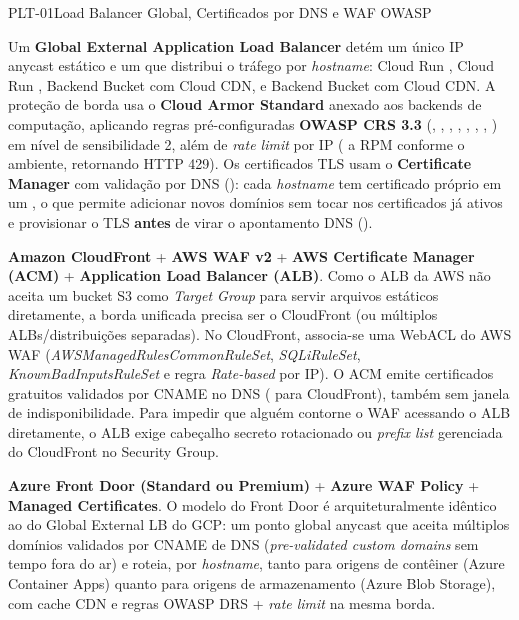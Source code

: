 \begin{pecaarq}{PLT-01}{Load Balancer Global, Certificados por DNS e WAF OWASP}{\sgcp~\nativo\enspace\saws~\equivalente\enspace\sazure~\nativo}
\begin{campos}
  \item[Como é hoje (GCP)] Um \textbf{Global External Application Load Balancer}
    detém um único IP anycast estático e um  que distribui o
    tráfego por \emph{hostname}:  \seta{} Cloud Run ,
     \seta{} Cloud Run ,  \seta{}
    Backend Bucket  com Cloud CDN, e  \seta{}
    Backend Bucket  com Cloud CDN. A proteção de borda usa o
    \textbf{Cloud Armor Standard} anexado aos backends de computação, aplicando
    regras pré-configuradas \textbf{OWASP CRS 3.3} (,
    , , ,
    , ,
    , ) em nível de
    sensibilidade 2, além de \emph{rate limit} por IP ( a  RPM
    conforme o ambiente, retornando HTTP 429). Os certificados TLS usam o
    \textbf{Certificate Manager} com validação por DNS ():
    cada \emph{hostname} tem certificado próprio em um , o
    que permite adicionar novos domínios sem tocar nos certificados já ativos e
    provisionar o TLS \textbf{antes} de virar o apontamento DNS ().
  \item[Equivalente AWS] \textbf{Amazon CloudFront} + \textbf{AWS WAF v2} +
    \textbf{AWS Certificate Manager (ACM)} + \textbf{Application Load Balancer
    (ALB)}. Como o ALB da AWS não aceita um bucket S3 como \emph{Target Group}
    para servir arquivos estáticos diretamente, a borda unificada precisa ser o
    CloudFront (ou múltiplos ALBs/distribuições separadas). No CloudFront,
    associa-se uma WebACL do AWS WAF (\emph{AWSManagedRulesCommonRuleSet},
    \emph{SQLiRuleSet}, \emph{KnownBadInputsRuleSet} e regra \emph{Rate-based}
    por IP). O ACM emite certificados gratuitos validados por CNAME no DNS
    ( para CloudFront), também sem janela de indisponibilidade.
    Para impedir que alguém contorne o WAF acessando o ALB diretamente, o ALB
    exige cabeçalho secreto rotacionado ou \emph{prefix list} gerenciada do
    CloudFront no Security Group.
  \item[Equivalente Azure] \textbf{Azure Front Door (Standard ou Premium)} +
    \textbf{Azure WAF Policy} + \textbf{Managed Certificates}. O modelo do Front
    Door é arquiteturalmente idêntico ao do Global External LB do GCP: um ponto
    global anycast que aceita múltiplos domínios validados por CNAME de DNS
    (\emph{pre-validated custom domains} sem tempo fora do ar) e roteia, por
    \emph{hostname}, tanto para origens de contêiner (Azure Container Apps)
    quanto para origens de armazenamento (Azure Blob Storage), com cache CDN e
    regras OWASP DRS + \emph{rate limit} na mesma borda.
\end{campos}
\end{pecaarq}

